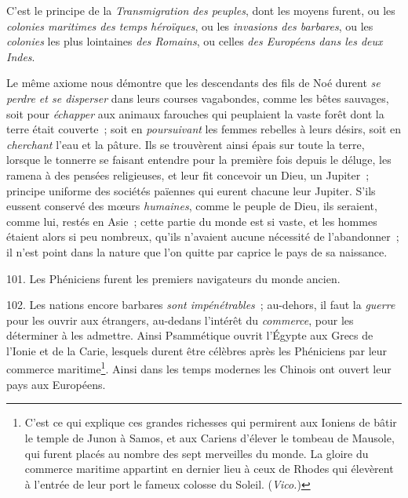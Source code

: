 \documentclass[french,twoside]{book} %
\begin{document}
C’est le principe de la {\itshape Transmigration des peuples}, dont les moyens furent, ou les {\itshape colonies maritimes des temps héroïques}, ou les {\itshape invasions des barbares}, ou les {\itshape colonies} les plus lointaines {\itshape des Romains}, ou celles {\itshape des Européens dans les deux Indes}.\par
Le même axiome nous démontre que les descendants des fils de Noé durent {\itshape se perdre et se disperser} dans leurs courses vagabondes, comme les bêtes sauvages, soit pour {\itshape échapper} aux animaux farouches qui peuplaient la vaste forêt dont la terre était couverte ; soit en {\itshape poursuivant} les femmes rebelles à leurs désirs, soit en {\itshape cherchant} l’eau et la pâture. Ils se trouvèrent ainsi épais sur toute la terre, lorsque le tonnerre se faisant entendre pour la première fois depuis le déluge, les ramena à des pensées religieuses, et leur fit concevoir un Dieu, un Jupiter ; principe uniforme des sociétés païennes qui eurent chacune leur Jupiter. S’ils eussent conservé des mœurs {\itshape humaines}, comme le peuple de Dieu, ils seraient, comme lui, restés en Asie ; cette partie du monde est si vaste, et les hommes étaient alors si peu nombreux, qu’ils n’avaient aucune nécessité de l’abandonner ; il n’est point dans la nature que l’on quitte par caprice le pays de sa naissance.\par
\par
 101. Les Phéniciens furent les premiers navigateurs du monde ancien.\par
102. Les nations encore barbares {\itshape sont impénétrables} ; au-dehors, il faut la {\itshape guerre} pour les ouvrir aux étrangers, au-dedans l’intérêt du {\itshape commerce}, pour les déterminer à les admettre. Ainsi Psammétique ouvrit l’Égypte aux Grecs de l’Ionie et de la Carie, lesquels durent être célèbres après les Phéniciens par leur commerce maritime\footnote{C’est ce qui explique ces grandes richesses qui permirent aux Ioniens de bâtir le temple de Junon à Samos, et aux Cariens d’élever le tombeau de Mausole, qui furent placés au nombre des sept merveilles du monde. La gloire du commerce maritime appartint en dernier lieu à ceux de Rhodes qui élevèrent à l’entrée de leur port le fameux colosse du Soleil. ({\itshape Vico.})}. Ainsi dans les temps modernes les Chinois ont ouvert leur pays aux Européens.\par
\end{document}
